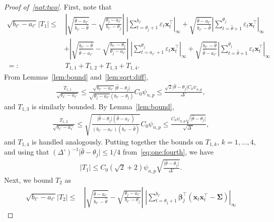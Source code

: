 \documentclass[11pt, a4paper]{article}
\newcommand{\mbf}{\mathbf}
\newcommand{\vep}{\varepsilon}
\renewcommand{\l}{\left}
\renewcommand{\r}{\right}
\def\wh{\widehat}
\newcommand{\cp}{\theta}
\theoremstyle{definition}
\theoremstyle{definition}
\theoremstyle{definition}
\theoremstyle{definition}
\theoremstyle{definition}
\theoremstyle{remark}
\theoremstyle{definition}
\theoremstyle{definition}
\theoremstyle{definition}
\begin{document}
\begin{proof}[Proof of~\ref{not:two}]
	First, note that
	\begin{align*}
	\sqrt{b_{\ell^\circ} - a_{\ell^\circ}} \vert T_1 \vert \le& \, \l\vert \sqrt{\frac{\wh\cp - a_{\ell^\circ}}{b_{\ell^\circ} - \wh\cp}} - \sqrt{\frac{\cp_j - a_{\ell^\circ}}{b_{\ell^\circ} - \cp_j}} \r\vert \; \l\vert \sum_{t = \cp_j + 1}^{b_{\ell^\circ}} \vep_t \mbf x_t^\top \r\vert_\infty + 
	\sqrt{\frac{\wh\cp - a_{\ell^\circ}}{b_{\ell^\circ} - \wh\cp}} \l\vert \sum_{t = \wh\cp + 1}^{\cp_j} \vep_t \mbf x_t^\top \r\vert_\infty
	\\ 
	& + \l\vert \sqrt{\frac{b_{\ell^\circ} - \wh\cp}{\wh\cp - a_{\ell^\circ}}} -  \sqrt{\frac{b_{\ell^\circ} - \cp_j}{\cp_j - a_{\ell^\circ}}} \r\vert \; \l\vert \sum_{t = a_{\ell^\circ} + 1}^{\cp_j} \vep_t \mbf x_t^\top \r\vert_\infty
	+ \sqrt{\frac{b_{\ell^\circ} - \wh\cp}{\wh\cp - a_{\ell^\circ}}} \l\vert \sum_{t = \wh\cp + 1}^{\cp_j} \vep_t \mbf x_t^\top \r\vert_\infty
	\\
	=:& \, T_{1, 1} + T_{1, 2} + T_{1, 3} + T_{1, 4}.
	\end{align*}
	From Lemmas~\ref{lem:bound} and~\ref{lem:sqrt:diff},
	\begin{align*}
	\frac{T_{1, 1}}{\sqrt{b_{\ell^\circ} - a_{\ell^\circ}}} \le \frac{\sqrt{b_{\ell^\circ} - a_{\ell^\circ}} \vert \wh\cp - \cp_j \vert}{\sqrt{\cp_j - a_{\ell^\circ}}(b_{\ell^\circ} - \cp_j)} C_0 \psi_{n, p} \le \frac{\sqrt{2} \vert \wh\cp - \cp_j \vert C_0 \psi_{n, p} }{\Delta^\circ},
	\end{align*}
	and $T_{1, 3}$ is similarly bounded.
	By Lemma~\ref{lem:bound},
	\begin{align*}
	\frac{T_{1, 2}}{\sqrt{b_{\ell^\circ} - a_{\ell^\circ}}} \le \sqrt{\frac{ \vert \wh\cp - \cp_j \vert (\wh\cp - a_{\ell^\circ})}{(b_{\ell^\circ} - a_{\ell^\circ})(b_{\ell^\circ} - \wh\cp)}} C_0 \psi_{n, p} \le \frac{C_0 \psi_{n, p} \sqrt{\vert \wh\cp - \cp_j \vert}}{\sqrt{\Delta^\circ}},
	\end{align*}
	and $T_{1, 4}$ is handled analogously. 
	Putting together the bounds on $T_{1, k}, \, k = 1, \ldots, 4$, and using that $(\Delta^\circ)^{-1} \vert \wh\cp - \cp_j \vert \le 1/4$ from~\eqref{eq:one:fourth}, we have
	\begin{align*}
	\vert T_1 \vert \le C_0 ( \sqrt{2} + 2 ) \psi_{n, p} \sqrt{\frac{\vert \wh\cp  - \cp_j \vert}{\Delta^\circ}}.
	\end{align*}
	Next, we bound $T_2$ as
	\begin{align*}
	\sqrt{b_{\ell^\circ} - a_{\ell^\circ}} \vert T_2 \vert \le & \,
	\l\vert \sqrt{\frac{\wh\cp - a_{\ell^\circ}}{b_{\ell^\circ} - \wh\cp}} - \sqrt{\frac{\cp_j - a_{\ell^\circ}}{b_{\ell^\circ} - \cp_j}} \r\vert \; \l\vert \sum_{t = \cp_j + 1}^{b_{\ell^\circ}} \bm\beta_j^\top \l( \mbf x_t \mbf x_t^\top - \bm\Sigma \r)\r\vert_\infty 

\end{align*}
\end{proof}
\end{document}
